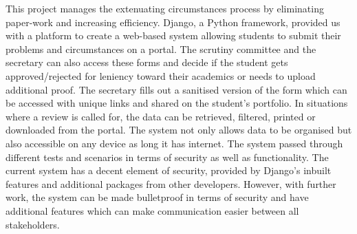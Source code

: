 \documentclass[../main.tex]{subfiles}
\begin{document}
\raggedright
This project manages the extenuating circumstances process by eliminating paper-work and increasing efficiency. Django, a Python framework, provided us with a platform to create a web-based system allowing students to submit their problems and circumstances on a portal. The scrutiny committee and the secretary can also access these forms and decide if the student gets approved/rejected for leniency toward their academics or needs to upload additional proof. The secretary fills out a sanitised version of the form which can be accessed with unique links and shared on the student's portfolio. In situations where a review is called for, the data can be retrieved, filtered, printed or downloaded from the portal. The system not only allows data to be organised but also accessible on any device as long it has internet. The system passed through different tests and scenarios in terms of security as well as functionality. The current system has a decent element of security, provided by Django's inbuilt features and additional packages from other developers. However, with further work, the system can be made bulletproof in terms of security and have additional features which can make communication easier between all stakeholders. 
\end{document}
